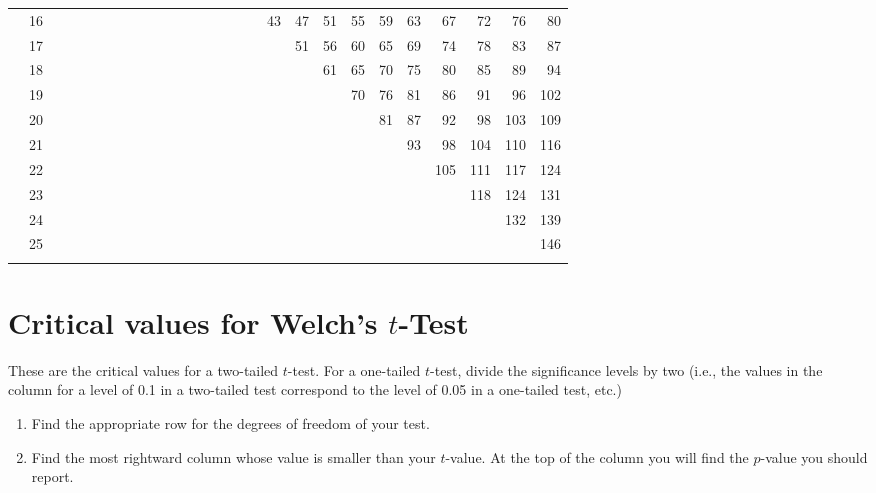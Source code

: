 \begin{table}[H]
{\begin{tabular}[t]{*{27}{r}}
 & 16 &  &  &  &  &  &  &  &  &  &  &  &  &  &  &  & 43 & 47 & 51 & 55 & 59 & 63 & 67 & 72 & 76 & 80\\
 & 17 &  &  &  &  &  &  &  &  &  &  &  &  &  &  &  &  & 51 & 56 & 60 & 65 & 69 & 74 & 78 & 83 & 87\\
 & 18 &  &  &  &  &  &  &  &  &  &  &  &  &  &  &  &  &  & 61 & 65 & 70 & 75 & 80 & 85 & 89 & 94\\
 & 19 &  &  &  &  &  &  &  &  &  &  &  &  &  &  &  &  &  &  & 70 & 76 & 81 & 86 & 91 & 96 & 102\\
 & 20 &  &  &  &  &  &  &  &  &  &  &  &  &  &  &  &  &  &  &  & 81 & 87 & 92 & 98 & 103 & 109\\
 & 21 &  &  &  &  &  &  &  &  &  &  &  &  &  &  &  &  &  &  &  &  & 93 & 98 & 104 & 110 & 116\\
 & 22 &  &  &  &  &  &  &  &  &  &  &  &  &  &  &  &  &  &  &  &  &  & 105 & 111 & 117 & 124\\
 & 23 &  &  &  &  &  &  &  &  &  &  &  &  &  &  &  &  &  &  &  &  &  &  & 118 & 124 & 131\\
 & 24 &  &  &  &  &  &  &  &  &  &  &  &  &  &  &  &  &  &  &  &  &  &  &  & 132 & 139\\
 & 25 &  &  &  &  &  &  &  &  &  &  &  &  &  &  &  &  &  &  &  &  &  &  &  &  & 146\\
\lspbottomrule
\end{tabular}}
\end{table}


\section{Critical values for Welch's $t$-Test}
\label{sec:ttestcriticalvalues}

These are the critical values for a two-tailed $t$-test. For a one-tailed $t$-test, divide the significance levels by two (i.e., the values in the column for a level of 0.1 in a two-tailed test correspond to the level of 0.05 in a one-tailed test, etc.)

\begin{enumerate}
  \item Find the appropriate row for the degrees of freedom of your test.
  \item Find the most rightward column whose value is smaller than your $t$-value. At the top of the column you will find the $p$-value you should report.
\end{enumerate}

